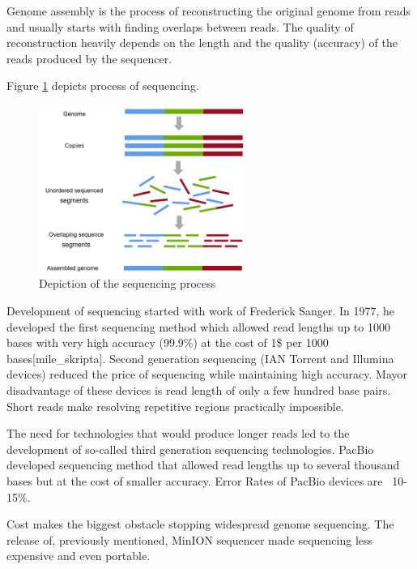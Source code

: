 \documentclass[times, utf8, diplomski, numeric, english]{fer}
\begin{document}
Genome assembly is the process of reconstructing the original genome from reads and usually starts with finding overlaps between reads.
The quality of reconstruction heavily depends on the length and the quality (accuracy) of the reads produced by the sequencer.

Figure \ref{fg:sequencing} depicts process of sequencing.

\begin{figure}[!ht]
	\begin{center}
		\includegraphics[width=0.6\textwidth]{./imgs/sequencing.png}
		\caption{Depiction of the sequencing process}
		\label{fg:sequencing}
	\end{center}
\end{figure}


Development of sequencing started with work of Frederick Sanger\cite{mile}\cite{Pettersson2009}. In 1977, he developed the first sequencing method which allowed 
read lengths up to 1000 bases with very high accuracy (99.9\%) at the cost of 1\$ per 1000 bases[mile\_skripta].
Second generation sequencing (IAN Torrent and Illumina devices) reduced the price of sequencing while maintaining high accuracy. Mayor disadvantage of these devices is read length of only a few hundred base pairs. Short reads make resolving repetitive regions practically impossible.

The need for technologies that would produce longer reads led to the development of so-called third generation sequencing technologies.
PacBio developed sequencing method that allowed read lengths up to several thousand bases but at the cost of smaller accuracy. Error Rates of PacBio devices are ~10-15\%. 

Cost makes the biggest obstacle stopping widespread genome sequencing. The release of, previously mentioned, MinION sequencer made sequencing less expensive and even portable.
\end{document}
